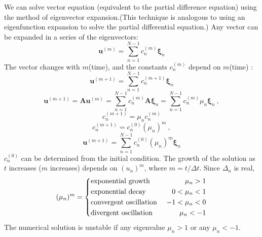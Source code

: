 \documentclass[12pt,a4paper]{article}
\renewcommand{\vec}[1]{\boldsymbol{#1}}
\begin{document}
We can solve vector equation (equivalent to the partial difference equation) using the method of eigenvector expansion.(This technique is analogous to using an eigenfunction expansion to solve the partial differential equation.) Any
vector can be expanded in a series of the eigenvectors:
\begin{equation}
\vec{u}^{(m)} = \sum_{n=1}^{N-1} c_n^{(m)} \vec{\xi}_n
\end{equation}
The vector changes with $m$(time), and the constants $c_n^{(m)}$ depend on $m$(time) :
\begin{equation}
\vec{u}^{(m+1)} = \sum_{n=1}^{N-1} c_n^{(m+1)} \vec{\xi}_n
\end{equation}
\begin{equation}
\vec{u}^{(m+1)} = \vec{A} \vec{u}^{(m)} = \sum_{n=1}^{N-1} c_n^{(m)}  \vec{A} \vec{\xi}_n = \sum_{n=1}^{N-1} c_n^{(m)}  \mu_n \vec{\xi}_n ~,
\end{equation}
\begin{equation}
c_n^{(m+1)} = \mu_n c_n^{(m)}
\end{equation}
\begin{equation}
c_n^{(m+1)} = c_n^{(0)}  (\mu_n )^m ~,
\end{equation}
\begin{equation}
\vec{u}^{(m+1)} = \sum_{n=1}^{N-1} c_n^{(0)}  (\mu_n)^m \vec{\xi}_n
\end{equation}
$c_n^{(0)} $ can be determined from the initial condition. The growth of the solution as $t$ increases ($m$ increases) depends on $(u_n)^m$, where $m=t/\Delta t$. Since $\Delta_n$ is real,
\begin{eqnarray*}
(\mu_n)^m = \left\{
\begin{aligned}
&{\rm exponential ~growth}~  &  \mu_n > 1 \\
&{\rm exponential~ decay} ~ &  0 < \mu_n < 1 \\
&{\rm convergent~ oscillation} ~ &  -1 < \mu_n < 0 \\
&{\rm divergent ~oscillation} ~ & \mu_n < -1
\end{aligned}
\right.
\end{eqnarray*}
The numerical solution is unstable if any eigenvalue $\mu_n > 1$ or any $\mu_n < -1$.
\end{document}
